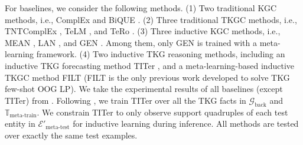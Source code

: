 \documentclass[runningheads]{llncs}
\begin{document}
For baselines, we consider the following methods. (1) Two traditional KGC methods, i.e., ComplEx \cite{DBLP:conf/icml/TrouillonWRGB16} and BiQUE \cite{DBLP:conf/emnlp/GuoK21}. (2) Three traditional TKGC methods, i.e., TNTComplEx \cite{DBLP:conf/iclr/LacroixOU20}, TeLM \cite{DBLP:conf/naacl/XuCNL21}, and TeRo \cite{DBLP:conf/coling/XuNAYL20}. (3) Three inductive KGC methods, i.e., MEAN \cite{DBLP:conf/ijcai/HamaguchiOSM17}, LAN \cite{DBLP:conf/aaai/WangHLP19}, and GEN \cite{DBLP:conf/nips/BaekLH20}. Among them, only GEN is trained with a meta-learning framework. (4) Two inductive TKG reasoning methods, including an inductive TKG forecasting method TITer \cite{DBLP:conf/emnlp/SunZMH021}, and a meta-learning-based inductive TKGC method FILT \cite{ding2022few} (FILT is the only previous work developed to solve TKG few-shot OOG LP). We take the experimental results of all baselines (except TITer) from \cite{ding2022few}. Following \cite{ding2022few}, we train TITer over all the TKG facts in $\mathcal{G}_{\text{back}}$ and $\mathbb{T}_{\text{meta-train}}$. We constrain TITer to only observe support quadruples of each test entity in $\mathcal{E}'_{\text{meta-test}}$ for inductive learning during inference. All methods are tested over exactly the same test examples.
\begin{table}[htbp]
    \centering
    \caption{Dataset statistics. 
    }
\label{tab: data statistics}
\end{table}
\end{document}
